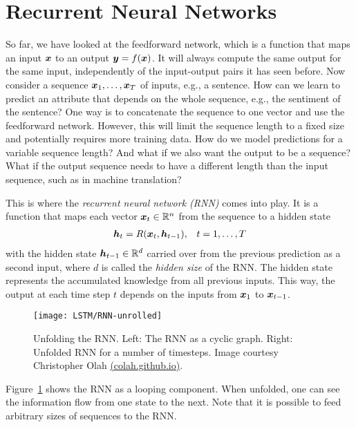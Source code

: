 		
		
	\section{Recurrent Neural Networks}\label{sec:recurrent_neural_networks}
		\newcommand{\imagecourtesycolah}{Image courtesy Christopher Olah \mbox{\href{http://colah.github.io/}{(colah.github.io)}}.}

		So far, we have looked at the feedforward network, which is a function that maps an input $\bm{x}$ to an output $\bm{y} = f(\bm{x})$.
		It will always compute the same output for the same input, independently of the input-output pairs it has seen before.
		Now consider a sequence $\bm{x}_1, \dots, \bm{x}_T$ of inputs, e.g., a sentence.
		How can we learn to predict an attribute that depends on the whole sequence, e.g., the sentiment of the sentence?
		One way is to concatenate the sequence to one vector and use the feedforward network.
		However, this will limit the sequence length to a fixed size and potentially requires more training data.
		How do we model predictions for a variable sequence length?
		And what if we also want the output to be a sequence? 
		What if the output sequence needs to have a different length than the input sequence, such as in machine translation? 
		
		This is where the \emph{recurrent neural network (RNN)} comes into play.
		It is a function that maps each vector $\bm{x}_t \in \mathbb{R}^n$ from the sequence to a hidden state
		\begin{eqnarray}
			\bm{h}_t = R(\bm{x}_t, \bm{h}_{t-1}), & &t = 1, \dots, T
		\end{eqnarray}
		with the hidden state $\bm{h}_{t-1} \in \mathbb{R}^d$ carried over from the previous prediction as a second input, where $d$ is called the \emph{hidden size} of the RNN. 
		The hidden state represents the accumulated knowledge from all previous inputs.
		This way, the output at each time step $t$ depends on the inputs from $\bm{x}_1$ to $\bm{x}_{t - 1}$.
		\begin{figure}[tb]
			\centering
			\texttt{[image: LSTM/RNN-unrolled]}
			\caption[Unfolding the RNN]
			{Unfolding the RNN. Left: The RNN as a cyclic graph. 
				Right: Unfolded RNN for a number of timesteps.
				\imagecourtesycolah}
			\label{fig:RNN-unrolled}
		\end{figure}
		Figure~\ref{fig:RNN-unrolled} shows the RNN as a looping component.
		When unfolded, one can see the information flow from one state to the next.
		Note that it is possible to feed arbitrary sizes of sequences to the RNN.
		

